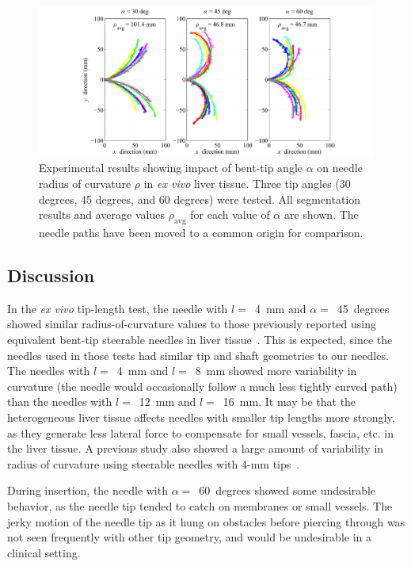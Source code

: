\begin{figure}[!ht]
\centering
\includegraphics[width=\textwidth]{Images/Chapter3/CurvatureVsAngle/CurvatureVsAngleData}%
\caption[Experimental results showing impact of bent-tip angle $\alpha$]{Experimental results showing impact of bent-tip angle $\alpha$ on needle radius of curvature $\rho$ in \textit{ex vivo} liver tissue. Three tip angles (30 degrees, 45 degrees, and 60 degrees) were tested. All segmentation results and average values $\rho_{\text{avg}}$ for each value of $\alpha$ are shown. The needle paths have been moved to a common origin for comparison.}
\label{fig:CurvatureVsAngleData}
\end{figure}

\subsection{Discussion}
In the \textit{ex vivo} tip-length test, the needle with $l =$~4~mm and $\alpha =$~45~degrees showed similar radius-of-curvature values to those previously reported using equivalent bent-tip steerable needles in liver tissue~\cite{Patil2014,Swaney2013}. This is expected, since the needles used in those tests had similar tip and shaft geometries to our needles. The needles with $l =$~4~mm and $l =$~8~mm showed more variability in curvature (the needle would occasionally follow a much less tightly curved path) than the needles with $l =$~12~mm and $l =$~16~mm. It may be that the heterogeneous liver tissue affects needles with smaller tip lengths more strongly, as they generate less lateral force to compensate for small vessels, fascia, etc. in the liver tissue. A previous study also showed a large amount of variability in radius of curvature using steerable needles with 4-mm tips~\cite{Majewicz2010}.

During insertion, the needle with $\alpha =$~60~degrees showed some undesirable behavior, as the needle tip tended to catch on membranes or small vessels. The jerky motion of the needle tip as it hung on obstacles before piercing through was not seen frequently with other tip geometry, and would be undesirable in a clinical setting.

